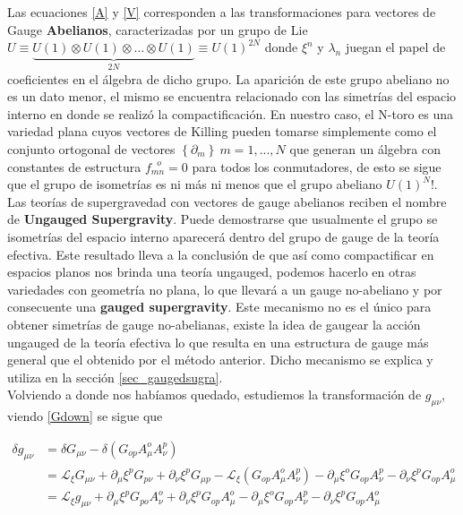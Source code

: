 \documentclass{article}
\numberwithin{equation}{section}
\begin{document}
Las ecuaciones \ref{A} y \ref{V} corresponden a las transformaciones para vectores de Gauge \textbf{Abelianos}, caracterizadas por un grupo de Lie $ U \equiv \underbrace{U(1) \otimes U(1) \otimes \dots \otimes U(1)}_{2N} \equiv U(1)^{2N} $ donde $ \xi^n $ y $ \lambda_n $ juegan el papel de coeficientes en el álgebra de dicho grupo. La aparición de este grupo abeliano no es un dato menor, el mismo se encuentra relacionado con las simetrías del espacio interno en donde se realizó la compactificación. En nuestro caso, el N-toro es una variedad plana cuyos vectores de Killing pueden tomarse simplemente como el conjunto ortogonal de vectores $ \left\{ \partial_m  \right\} \ m=1,...,N$ que generan un álgebra con constantes de estructura $ f_{m n}^{\ \ \ o} = 0 $ para todos los conmutadores, de esto se sigue que el grupo de isometrías es ni más ni menos que el grupo abeliano $ U(1)^N $!. Las teorías de supergravedad con vectores de gauge abelianos reciben el nombre de \textbf{Ungauged Supergravity}. Puede demostrarse que usualmente el grupo se isometrías del espacio interno aparecerá dentro del grupo de gauge de la teoría efectiva. Este resultado lleva a la conclusión de que así como compactificar en espacios planos nos brinda una teoría ungauged, podemos hacerlo en otras variedades con geometría no plana, lo que llevará a un gauge no-abeliano y por consecuente una \textbf{gauged supergravity}. Este mecanismo no es el único para obtener simetrías de gauge no-abelianas, existe la idea de gaugear la acción ungauged de la teoría efectiva lo que resulta en una estructura de gauge más general que el obtenido por el método anterior. Dicho mecanismo se explica y utiliza en la sección \ref{sec_gaugedsugra}.\\ 

Volviendo a donde nos habíamos quedado, estudiemos la transformación de $ g_{\mu \nu} $, viendo \ref{Gdown} se sigue que

\begin{equation}
\begin{aligned}
\delta g_{\mu \nu} &= \delta G_{\mu \nu} - \delta \left( G_{o p} A^o_\mu A^p_{\nu} \right)\\
&= \mathcal{L}_{\xi} G_{\mu \nu} + \partial_{\mu} \xi^p G_{p \nu} + \partial_{\nu} \xi^p G_{\mu p} - \mathcal{L}_{\xi} \left( G_{o p} A^o_{\mu} A^p_{\nu}\right) -  \partial_{\mu} \xi^o G_{o p} A^p_{\nu} - \partial_{\nu} \xi^p G_{o p}A^o_{\mu}\\
&= \mathcal{L}_{\xi} g_{\mu \nu} + \partial_{\mu} \xi^p G_{p o} A^o_{\nu} + \partial_{\nu} \xi^p G_{o p} A^o_\mu -  \partial_{\mu} \xi^o G_{o p} A^p_{\nu} - \partial_{\nu} \xi^p G_{o p}A^o_{\mu}
\end{aligned}
\end{equation}
\end{document}
